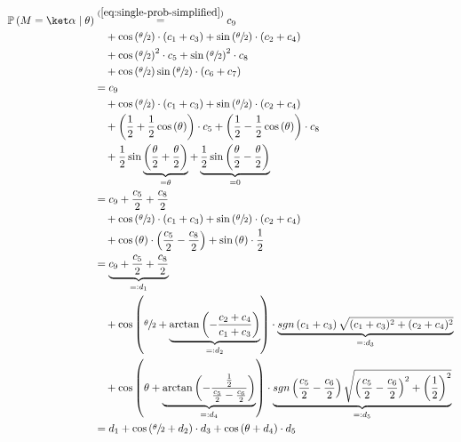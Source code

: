 \begin{equation}
    \label{eq:single-prob-simplified-simplified}
    \begin{split}
        \mathbb{P}\left(M = \ket\alpha \mid \theta\right)
            &\stackrel{(\ref{eq:single-prob-simplified})}= c_9 \\
                &\quad + \cos\left(\sfrac\theta2\right) \cdot \left(c_1 + c_3\right) + \sin\left(\sfrac\theta2\right) \cdot \left(c_2 + c_4\right) \\
                &\quad + \cos\left(\sfrac\theta2\right)^2 \cdot c_5 + \sin\left(\sfrac\theta2\right)^2 \cdot c_8 \\
                &\quad + \cos\left(\sfrac\theta2\right)\sin\left(\sfrac\theta2\right) \cdot \left(c_6 + c_7\right) \\
            &= c_9 \\
                &\quad + \cos\left(\sfrac\theta2\right) \cdot \left(c_1 + c_3\right) + \sin\left(\sfrac\theta2\right) \cdot \left(c_2 + c_4\right) \\
                &\quad + \left(\frac12 + \frac12 \cos\left(\theta\right)\right) \cdot c_5 + \left(\frac12 - \frac12 \cos\left(\theta\right)\right) \cdot c_8 \\
                &\quad + \frac12 \sin\underbrace{\left(\frac\theta2 + \frac\theta2\right)}_{=\theta} + \underbrace{\frac12 \sin\left(\frac\theta2 - \frac\theta2\right)}_{= 0} \\
            &= c_9 + \frac{c_5}{2} + \frac{c_8}{2} \\
                &\quad + \cos\left(\sfrac\theta2\right) \cdot \left(c_1 + c_3\right) + \sin\left(\sfrac\theta2\right) \cdot \left(c_2 + c_4\right) \\
                &\quad + \cos\left(\theta\right) \cdot \left(\frac{c_5}{2} - \frac{c_8}{2}\right) + \sin\left(\theta\right) \cdot \frac12 \\
            &= \underbrace{c_9 + \frac{c_5}{2} + \frac{c_8}{2}}_{=: d_1} \\
                &\quad + \cos\left(\sfrac\theta2 + \underbrace{\arctan\left(-\frac{c_2 + c_4}{c_1 + c_3}\right)}_{=: d_2}\right) \cdot \underbrace{sgn\left(c_1 + c_3\right) \sqrt{(c_1 + c_3)^2 + (c_2 + c_4)^2}}_{=: d_3} \\
                &\quad + \cos\left(\theta + \underbrace{\arctan\left(-\frac{\frac12}{\frac{c_5}{2} - \frac{c_6}{2}}\right)}_{=: d_4}\right) \cdot \underbrace{sgn\left(\frac{c_5}{2} - \frac{c_6}{2}\right) \sqrt{\left(\frac{c_5}{2} - \frac{c_6}{2}\right)^2 + \left(\frac12\right)^2}}_{=: d_5} \\
            &= d_1 + \cos\left(\sfrac\theta2 + d_2\right) \cdot d_3 + \cos\left(\theta + d_4\right) \cdot d_5
    \end{split}
\end{equation}

